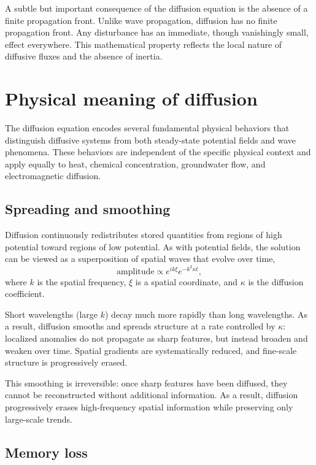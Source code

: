 A subtle but important consequence of the diffusion equation is the absence of a finite propagation front.  Unlike wave propagation, diffusion has no finite propagation front. Any disturbance has an immediate, though vanishingly small, effect everywhere. This mathematical property reflects the local nature of diffusive fluxes and the absence of inertia.

\section{Physical meaning of diffusion}

The diffusion equation encodes several fundamental physical behaviors that distinguish diffusive systems from both steady-state potential fields and wave phenomena. These behaviors are independent of the specific physical context and apply equally to heat, chemical concentration, groundwater flow, and electromagnetic diffusion.

\subsection{Spreading and smoothing}

Diffusion continuously redistributes stored quantities from regions of high potential toward regions of low potential. As with potential fields, the solution can be viewed as a superposition of spatial waves that evolve over time,
\[
    \text{amplitude} \propto e^{ik\xi} e^{-k^2 \kappa t},
\]
where $k$ is the spatial frequency, $\xi$ is a spatial coordinate, and $\kappa$ is the diffusion coefficient.

Short wavelengths (large $k$) decay much more rapidly than long wavelengths. As a result, diffusion smooths and spreads structure at a rate controlled by $\kappa$: localized anomalies do not propagate as sharp features, but instead broaden and weaken over time. Spatial gradients are systematically reduced, and fine-scale structure is progressively erased.

This smoothing is irreversible: once sharp features have been diffused, they cannot be reconstructed without additional information. As a result, diffusion progressively erases high-frequency spatial information while preserving only large-scale trends.

\subsection{Memory loss}

